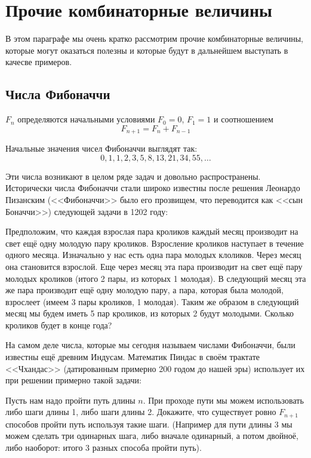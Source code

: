 \section{Прочие комбинаторные величины}

В этом параграфе мы очень кратко рассмотрим прочие комбинаторные величины, которые могут оказаться полезны и которые будут в дальнейшем выступать в качесве примеров.

\subsection{Числа Фибоначчи}

\begin{definition}
 $F_n$ определяются начальными условиями $F_0 = 0$, $F_1 = 1$ и соотношением
$$F_{n+1} = F_n + F_{n-1}$$
\end{definition}

Начальные значения чисел Фибоначчи выглядят так:
$$0, 1, 1, 2, 3, 5, 8, 13, 21, 34, 55, \ldots$$

Эти числа возникают в целом ряде задач и довольно распространены. Исторически числа Фибоначчи стали широко известны после решения Леонардо Пизанским (<<Фибоначчи>>  было его прозвищем, что переводится как <<сын Боначчи>>) следующей задачи в 1202 году:

\begin{exercise}
Предположим, что каждая взрослая пара кроликов каждый месяц производит на свет ещё одну молодую пару кроликов. Взросление кроликов наступает в течение одного месяца. Изначально у нас есть одна пара молодых клоликов. Через месяц она становится взрослой. Еще через месяц эта пара производит на свет ещё пару молодых кроликов (итого 2 пары, из которых 1 молодая). В следующий месяц эта же пара производит ещё одну молодую пару, а пара, которая была молодой, взрослеет (имеем 3 пары кроликов, 1 молодая). Таким же образом в следующий месяц мы будем иметь 5 пар кроликов, из которых 2 будут молодыми. Сколько кроликов будет в конце года?
\end{exercise}

На самом деле числа, которые мы сегодня называем числами Фибоначчи, были известны ещё древним Индусам. Математик Пиндас в своём трактате <<Чхандас>> (датированным примерно 200 годом до нашей эры) использует их при решении примерно такой задачи:

\begin{exercise}
Пусть нам надо пройти путь длины $n$. При проходе пути мы можем использовать либо шаги длины 1, либо шаги длины 2. Докажите, что существует ровно $F_{n+1}$ способов пройти путь используя такие шаги. (Например для пути длины 3 мы можем сделать три одинарных шага, либо вначале одинарный, а потом двойноё, либо наоборот: итого 3 разных способа пройти путь).
\end{exercise}

